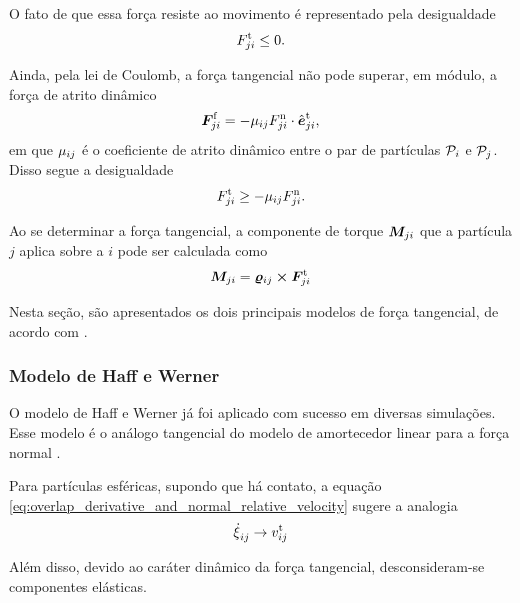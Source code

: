 O fato de que essa força resiste ao movimento é representado pela desigualdade
\begin{equation*}
	{F}_{j i}^{\text{t}} \leq 0.
\end{equation*}

Ainda, pela lei de Coulomb, a força tangencial não pode superar, em módulo, a força de atrito dinâmico 
\begin{equation*}
	{\bm{F}}_{j i}^{\text{f}} = - {\mu}_{i j}{F}_{j i}^{\text{n}}\cdot{\hat{\bm{e}}}_{j i}^{\text{t}},
\end{equation*}
em que \({\mu}_{i j}\) é o coeficiente de atrito dinâmico entre o par de partículas \(\particlei\) e \(\particlej\). Disso segue a desigualdade
\begin{equation} \label{eq:coulomb_law}
	{F}_{j i}^{\text{t}} \geq - {\mu}_{i j}{F}_{j i}^{\text{n}}.
\end{equation}

Ao se determinar a força tangencial, a componente de torque \({\bm{M}}_{j i}\) que a partícula \(j\) aplica sobre a \(i\) pode ser calculada como
\begin{equation*}
	{\bm{M}}_{j i} = {\bm{\varrho}}_{i j}\cross{\bm{F}}_{j i}^{\text{t}}
\end{equation*}

Nesta seção, são apresentados os dois principais modelos de força tangencial, de acordo com .

\subsubsection*{Modelo de Haff e Werner}

O modelo de Haff e Werner já foi aplicado com sucesso em diversas simulações. Esse modelo é o análogo tangencial do modelo de amortecedor linear para a força normal \cite{bib:computational_granular_dynamics}.

Para partículas esféricas, supondo que há contato, a equação \eqref{eq:overlap_derivative_and_normal_relative_velocity} sugere a analogia
\begin{equation*}
	\overlapDerivativeij \to \relativeTangentialVelocityScalarij
\end{equation*}

Além disso, devido ao caráter dinâmico da força tangencial, desconsideram-se componentes elásticas.

